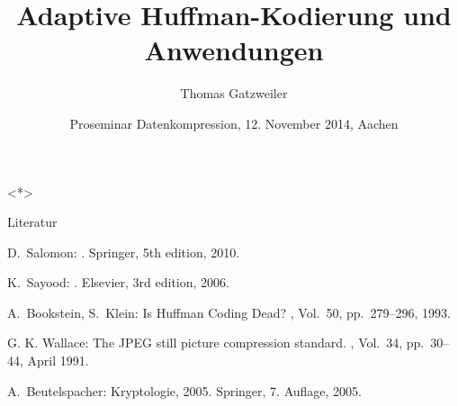 \documentclass[xcolor=dvipsnames,presentation]{beamer}    %
\title[Huffman-Kodierung]{Adaptive Huffman-Kodierung und Anwendungen}
\author[Gatzweiler]{Thomas Gatzweiler}
\institute[RWTH Aachen University] %
{
  \strut Human Language Technology and Pattern Recognition\\
  \strut Computer Science Department, RWTH Aachen University %
}
\date[12. November 2014]{Proseminar Datenkompression, 12. November 2014, Aachen}
\begin{document}
\nocite{*}

\begin{frame}[label=titlepage]
  \titlepage
\end{frame}


%

\begin{frame}<*>{}
  \tableofcontents[subsectionstyle=show/hide/hide]
\end{frame}




\begin{frame}[fragile]{Literatur}

  \begin{thebibliography}{}

D.~Salomon:
.
\newblock Springer, 5th edition, 2010.

K.~Sayood:
.
\newblock Elsevier, 3rd edition, 2006.

A.~Bookstein, S.~Klein: \newblock Is Huffman Coding Dead?
, Vol.~50, pp.~279--296, 1993.

G. K. Wallace: \newblock The {JPEG} still picture compression standard.
, Vol.~34, pp.~30--44, April 1991.

A.~Beutelspacher: \newblock Kryptologie, 2005.
\newblock Springer, 7. Auflage, 2005.
\end{thebibliography}

\end{frame}
\end{document}
